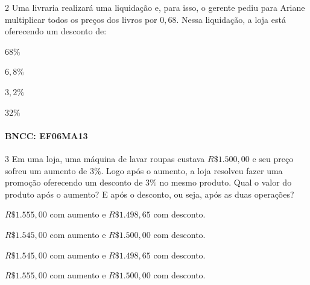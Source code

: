 \num{2}  Uma livraria realizará uma liquidação e, para isso, o gerente pediu
para Ariane multiplicar todos os preços dos livros por $0,68$. Nessa
liquidação, a loja está oferecendo um desconto de:

\begin{escolha}
\item $68\%$
\item $6,8\%$
\item $3,2\%$
\item $32\%$
\end{escolha}

\paragraph{BNCC: EF06MA13 }


\num{3}  Em uma loja, uma máquina de lavar roupas custava $R\$1.500,00$ e seu
preço sofreu um aumento de $3\%$. Logo após o aumento, a loja resolveu
fazer uma promoção oferecendo um desconto de $3\%$ no mesmo produto. Qual
o valor do produto após o aumento? E após o desconto, ou seja, após as
duas operações?

\begin{escolha}
\item $R\$1.555,00$ com aumento e $R\$1.498,65$ com desconto.
\item $R\$1.545,00$ com aumento e $R\$1.500,00$ com desconto.
\item $R\$1.545,00$ com aumento e $R\$1.498,65$ com desconto.
\item $R\$1.555,00$ com aumento e $R\$1.500,00$ com desconto.
\end{escolha}

